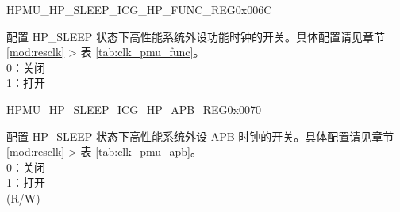 \begin{register}{H}{PMU\_HP\_SLEEP\_ICG\_HP\_FUNC\_REG}{0x006C}\label{regdesc:PMUHPSLEEPICGHPFUNCREG}
%
\regnewline%
\begin{regdesc}\begin{reglist}
\label{fielddesc:PMUHPSLEEPDIGICGFUNCEN}\item [PMU\_HP\_SLEEP\_DIG\_ICG\_FUNC\_EN] 配置 HP\_SLEEP 状态下高性能系统外设功能时钟的开关。具体配置请见章节 \ref{mod:resclk} \textit{} > 表 \ref{tab:clk_pmu_func}。 \\
0：关闭\\
1：打开\\
\end{reglist}\end{regdesc}
\end{register}


\begin{register}{H}{PMU\_HP\_SLEEP\_ICG\_HP\_APB\_REG}{0x0070}\label{regdesc:PMUHPSLEEPICGHPAPBREG}
%
\regnewline%
\begin{regdesc}\begin{reglist}
\label{fielddesc:PMUHPSLEEPDIGICGAPBEN}\item [PMU\_HP\_SLEEP\_DIG\_ICG\_APB\_EN] 配置 HP\_SLEEP 状态下高性能系统外设 APB 时钟的开关。具体配置请见章节 \ref{mod:resclk} \textit{} > 表 \ref{tab:clk_pmu_apb}。 \\
0：关闭\\
1：打开\\
(R/W)
\end{reglist}\end{regdesc}
\end{register}



